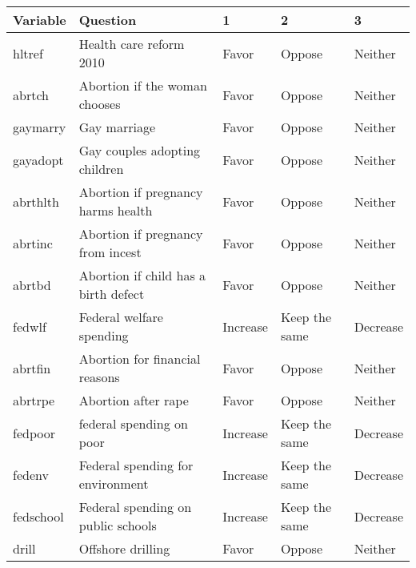 \begin{table}[ht]
\centering
\begin{tabular}{lllll}
\hline
Variable  & Question                                   & 1                                      & 2             & 3             \\
\hline
hltref    & Health care reform 2010                    & Favor                                  & Oppose        & Neither       \\
abrtch    & Abortion if the woman chooses              & Favor                                  & Oppose        & Neither       \\
gaymarry  & Gay marriage                               & Favor                                  & Oppose        & Neither       \\
gayadopt  & Gay couples adopting children              & Favor                                  & Oppose        & Neither       \\
abrthlth  & Abortion if pregnancy harms  health        & Favor                                  & Oppose        & Neither       \\
abrtinc   & Abortion if pregnancy from incest          & Favor                                  & Oppose        & Neither       \\
abrtbd    & Abortion if child has a birth defect       & Favor                                  & Oppose        & Neither       \\
fedwlf    & Federal welfare spending                   & Increase                               & Keep the same & Decrease      \\
abrtfin   & Abortion for financial reasons             & Favor                                  & Oppose        & Neither       \\
abrtrpe   & Abortion after rape                        & Favor                                  & Oppose        & Neither       \\
fedpoor   & federal spending on poor                   & Increase                               & Keep the same & Decrease      \\
fedenv    & Federal spending for environment           & Increase                               & Keep the same & Decrease      \\
fedschool & Federal spending on public schools         & Increase                               & Keep the same & Decrease      \\
drill     & Offshore drilling                          & Favor                                  & Oppose        & Neither       \\

\end{tabular}
\end{table}
